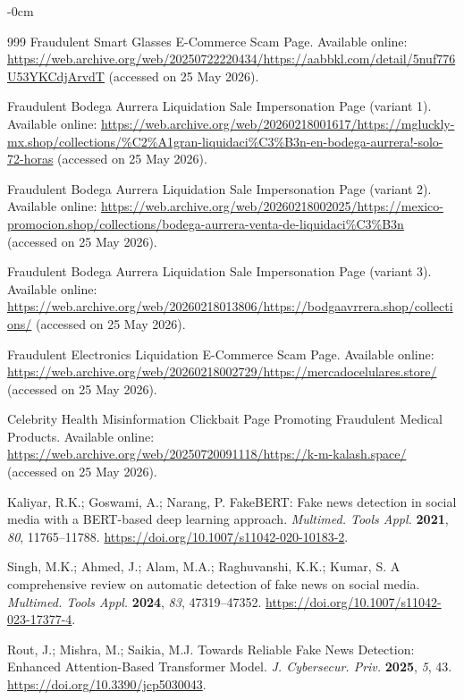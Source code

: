 \documentclass[informatics,article,submit,pdftex,moreauthors]{Definitions/mdpi}
\begin{document}
\begin{adjustwidth}{-\extralength}{0cm}
\begin{thebibliography}{999}
Fraudulent Smart Glasses E-Commerce Scam Page. Available online: \url{https://web.archive.org/web/20250722220434/https://aabbkl.com/detail/5nuf776U53YKCdjArvdT} (accessed on 25 May 2026).
 
Fraudulent Bodega Aurrera Liquidation Sale Impersonation Page (variant 1). Available online: \url{https://web.archive.org/web/20260218001617/https://mgluckly-mx.shop/collections/\%C2\%A1gran-liquidaci\%C3\%B3n-en-bodega-aurrera!-solo-72-horas} (accessed on 25 May 2026).
 
Fraudulent Bodega Aurrera Liquidation Sale Impersonation Page (variant 2). Available online: \url{https://web.archive.org/web/20260218002025/https://mexico-promocion.shop/collections/bodega-aurrera-venta-de-liquidaci\%C3\%B3n} (accessed on 25 May 2026).
 
Fraudulent Bodega Aurrera Liquidation Sale Impersonation Page (variant 3). Available online: \url{https://web.archive.org/web/20260218013806/https://bodgaavrrera.shop/collections/} (accessed on 25 May 2026).
 
Fraudulent Electronics Liquidation E-Commerce Scam Page. Available online: \url{https://web.archive.org/web/20260218002729/https://mercadocelulares.store/} (accessed on 25 May 2026).
 
Celebrity Health Misinformation Clickbait Page Promoting Fraudulent Medical Products. Available online: \url{https://web.archive.org/web/20250720091118/https://k-m-kalash.space/} (accessed on 25 May 2026).
 
Kaliyar, R.K.; Goswami, A.; Narang, P. FakeBERT: Fake news detection in social media with a BERT-based deep learning approach. \textit{Multimed. Tools Appl.} \textbf{2021}, \textit{80}, 11765--11788. \href{https://doi.org/10.1007/s11042-020-10183-2}{https://doi.org/10.1007/s11042-020-10183-2}.
 
Singh, M.K.; Ahmed, J.; Alam, M.A.; Raghuvanshi, K.K.; Kumar, S. A comprehensive review on automatic detection of fake news on social media. \textit{Multimed. Tools Appl.} \textbf{2024}, \textit{83}, 47319--47352. \href{https://doi.org/10.1007/s11042-023-17377-4}{https://doi.org/10.1007/s11042-023-17377-4}.
 
Rout, J.; Mishra, M.; Saikia, M.J. Towards Reliable Fake News Detection: Enhanced Attention-Based Transformer Model. \textit{J. Cybersecur. Priv.} \textbf{2025}, \textit{5}, 43. \href{https://doi.org/10.3390/jcp5030043}{https://doi.org/10.3390/jcp5030043}.
 

\end{thebibliography}
\end{adjustwidth}
\end{document}
